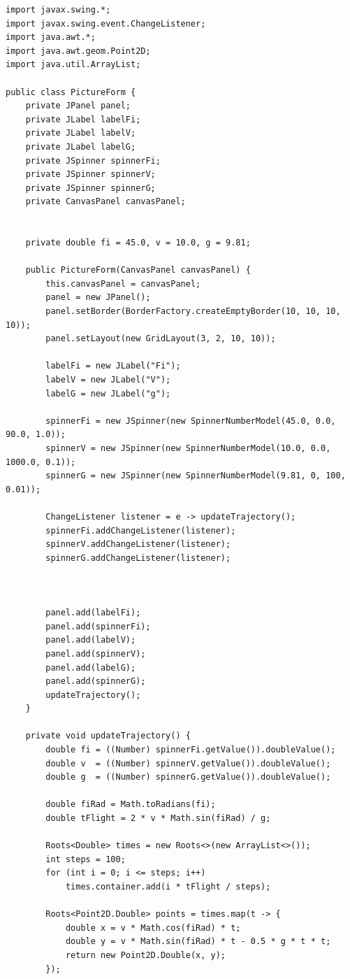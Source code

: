 \documentclass[a4paper, 14pt]{extarticle}
\begin{document}
\begin{lstlisting}
import javax.swing.*;
import javax.swing.event.ChangeListener;
import java.awt.*;
import java.awt.geom.Point2D;
import java.util.ArrayList;

public class PictureForm {
    private JPanel panel;
    private JLabel labelFi;
    private JLabel labelV;
    private JLabel labelG;
    private JSpinner spinnerFi;
    private JSpinner spinnerV;
    private JSpinner spinnerG;
    private CanvasPanel canvasPanel;


    private double fi = 45.0, v = 10.0, g = 9.81;

    public PictureForm(CanvasPanel canvasPanel) {
        this.canvasPanel = canvasPanel;
        panel = new JPanel();
        panel.setBorder(BorderFactory.createEmptyBorder(10, 10, 10, 10));
        panel.setLayout(new GridLayout(3, 2, 10, 10));

        labelFi = new JLabel("Fi");
        labelV = new JLabel("V");
        labelG = new JLabel("g");

        spinnerFi = new JSpinner(new SpinnerNumberModel(45.0, 0.0, 90.0, 1.0));
        spinnerV = new JSpinner(new SpinnerNumberModel(10.0, 0.0, 1000.0, 0.1));
        spinnerG = new JSpinner(new SpinnerNumberModel(9.81, 0, 100, 0.01));

        ChangeListener listener = e -> updateTrajectory();
        spinnerFi.addChangeListener(listener);
        spinnerV.addChangeListener(listener);
        spinnerG.addChangeListener(listener);



        panel.add(labelFi);
        panel.add(spinnerFi);
        panel.add(labelV);
        panel.add(spinnerV);
        panel.add(labelG);
        panel.add(spinnerG);
        updateTrajectory();
    }

    private void updateTrajectory() {
        double fi = ((Number) spinnerFi.getValue()).doubleValue();
        double v  = ((Number) spinnerV.getValue()).doubleValue();
        double g  = ((Number) spinnerG.getValue()).doubleValue();

        double fiRad = Math.toRadians(fi);
        double tFlight = 2 * v * Math.sin(fiRad) / g;

        Roots<Double> times = new Roots<>(new ArrayList<>());
        int steps = 100;
        for (int i = 0; i <= steps; i++)
            times.container.add(i * tFlight / steps);

        Roots<Point2D.Double> points = times.map(t -> {
            double x = v * Math.cos(fiRad) * t;
            double y = v * Math.sin(fiRad) * t - 0.5 * g * t * t;
            return new Point2D.Double(x, y);
        });


\end{lstlisting}
\end{document}
